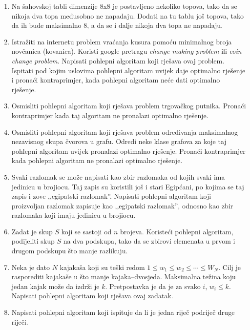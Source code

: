 \documentclass[b5paper, utf8, 11pt, colorlinks]{book}
\theoremstyle{definition}
\begin{document}
 \begin{enumerate}
	\item Na šahovskoj tabli dimenzije 8x8 je postavljeno nekoliko topova, tako da se nikoja dva topa međusobno ne napadaju. Dodati na tu tablu još topova, tako da ih bude maksimalno 8, a da se i dalje nikoja dva topa ne napadaju.
	\item Istražiti na internetu problem vraćanja kusura pomoću minimalnog broja novčanica (kovanica). Koristi google pretragu \textit{change-making problem} ili \textit{coin change problem}. Napisati pohlepni algoritam koji rješava ovaj problem. Ispitati pod kojim uslovima pohlepni algoritam uvijek daje optimalno rješenje i pronaći kontraprimjer, kada pohlepni algoritam neće dati optimalno rješenje.

	
	\item Osmisliti pohlepni algoritam koji rješava problem trgovačkog putnika. Pronaći kontraprimjer kada taj algoritam ne pronalazi optimalno rješenje.
	
	\item Osmisliti pohlepni algoritam koji rješava problem određivanja maksimalnog nezavisnog skupa čvorova u grafu. Odredi neke klase grafova za koje taj pohlepni algoritam uvijek pronalazi optimalno rješenje. Pronaći kontraprimjer kada pohlepni algoritam ne pronalazi optimalno rješenje.
	
	\item Svaki razlomak se može napisati kao zbir razlomaka od kojih svaki ima jedinicu u brojiocu. Taj zapis su koristili još i stari Egipćani, po kojima se taj zapis i zove ,,egipatski razlomak''. 
	Napisati pohlepni algoritam koji proizvoljan razlomak zapisuje kao ,,egipatski razlomak'', odnosno kao zbir razlomaka koji imaju jedinicu u brojiocu.
	
	\item Zadat je skup $S$ koji se sastoji od $n$ brojeva. Koristeći pohlepni algoritam, podijeliti skup $S$ na dva podskupa, tako da se zbirovi elemenata u prvom i drugom podskupu što manje razlikuju.
	
	\item Neka je dato $N$ kajakaša koji su teški redom $1\leqslant w_1\leqslant w_2\leqslant \cdots \leqslant W_N$. Cilj je rasporediti kajakaše u što manje kajaka--dvosjeda. Maksimalna težina koju jedan kajak može da izdrži je $k$. Pretpostavka je da je za svako $i$, $w_i\leqslant k$. Napisati pohlepni algoritam koji rješava ovaj zadatak.
	
	\item  Napisati pohlepni algoritam koji ispituje da li je jedna riječ podriječ druge riječi.
	

\end{enumerate}
\end{document}

